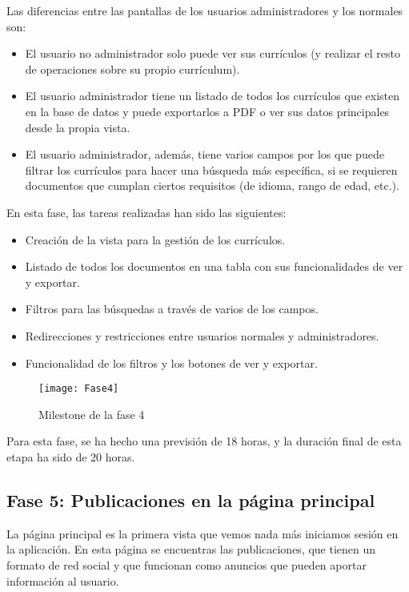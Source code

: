 Las diferencias entre las pantallas de los usuarios administradores y los normales son:
\begin{itemize}
\tightlist
\item El usuario no administrador solo puede ver sus currículos (y realizar el resto
de operaciones sobre su propio currículum).
\item El usuario administrador tiene un listado de todos los currículos que existen
en la base de datos y puede exportarlos a PDF o ver sus datos principales desde la
propia vista.
\item El usuario administrador, además, tiene varios campos por los que puede filtrar
los currículos para hacer una búsqueda más específica, si se requieren documentos
que cumplan ciertos requisitos (de idioma, rango de edad, etc.).
\end{itemize}

En esta fase, las tareas realizadas han sido las siguientes:
\begin{itemize}
\tightlist
\item Creación de la vista para la gestión de los currículos.
\item Listado de todos los documentos en una tabla con sus funcionalidades de ver y exportar.
\item Filtros para las búsquedas a través de varios de los campos.
\item Redirecciones y restricciones entre usuarios normales y administradores.
\item Funcionalidad de los filtros y los botones de ver y exportar.
\end{itemize}

\begin{figure}
    \centering
    \texttt{[image: Fase4]}
    \caption{Milestone de la fase 4}
\end{figure}

Para esta fase, se ha hecho una previsión de 18 horas, y la duración final de esta etapa ha sido
de 20 horas.

\subsection{Fase 5: Publicaciones en la página principal}
La página principal es la primera vista que vemos nada más iniciamos sesión en la aplicación.
En esta página se encuentras las publicaciones, que tienen un formato de red social y que 
funcionan como anuncios que pueden aportar información al usuario.

